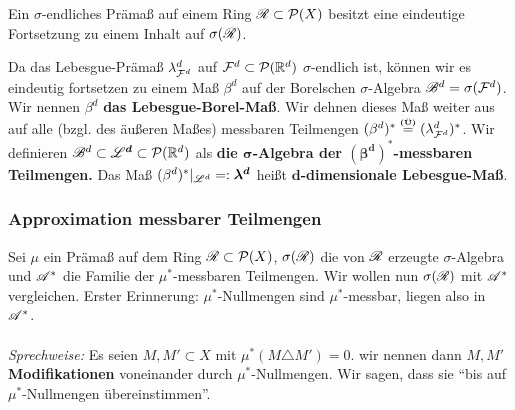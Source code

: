 \begin{korollar}
\begin{mdframed}
Ein $\sigma$-endliches Prämaß auf einem Ring $\RR \subset \PP(X)$ besitzt eine eindeutige Fortsetzung zu einem Inhalt auf $\sigma(\RR)$.
\end{mdframed}
\end{korollar}

\begin{definition}
\begin{mdframed}
Da das Lebesgue-Prämaß $\lambda^d_{\FF^d}$ auf $\FF^d\subset \PP(\R^d)$ $\sigma$-endlich ist, können wir es eindeutig fortsetzen zu einem Maß $\beta^d$ auf der Borelschen $\sigma$-Algebra $\BB^d = \sigma(\FF^d)$. Wir nennen $\beta^d$ \textbf{das Lebesgue-Borel-Maß}. Wir dehnen dieses Maß weiter aus auf alle (bzgl. des äußeren Maßes) messbaren Teilmengen $(\beta^d)^* \overset{\text{\Ueb}}= (\lambda^d_{\FF^d})^*$. Wir definieren $\BB^d \subset \boldsymbol{\LL^d} \subset \PP(\R^d)$ als \textbf{die $\boldsymbol\sigma$-Algebra der $\boldsymbol{(\beta^d)^*}$-messbaren Teilmengen. } Das Maß $(\beta^d)^*|_{\LL^d} =: \boldsymbol{\lambda^d}$ heißt \textbf{$\boldsymbol{d}$-dimensionale Lebesgue-Maß}.
\end{mdframed}
\end{definition}

\subsubsection{Approximation messbarer Teilmengen}
Sei $\mu$ ein Prämaß auf dem Ring $\RR \subset \PP(X)$, $\sigma(\RR)$ die von $\RR$ erzeugte $\sigma$-Algebra und $\AA^*$ die Familie der $\mu^*$-messbaren Teilmengen. Wir wollen nun $\sigma(\RR)$ mit $\AA^*$ vergleichen. Erster Erinnerung: $\mu^*$-Nullmengen sind $\mu^*$-messbar, liegen also in $\AA^*$.\\\\
\textit{Sprechweise:} Es seien $M,M'\subset X$ mit $\mu^*(M \triangle M') = 0$. wir nennen dann $M, M'$ \textbf{Modifikationen} voneinander durch $\mu^*$-Nullmengen. Wir sagen, dass sie ``bis auf $\mu^*$-Nullmengen übereinstimmen''.

